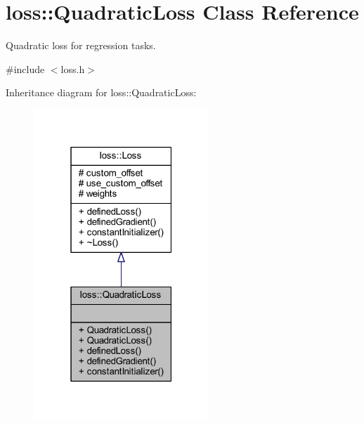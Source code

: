 \hypertarget{classloss_1_1_quadratic_loss}{}\section{loss\+:\+:Quadratic\+Loss Class Reference}
\label{classloss_1_1_quadratic_loss}


Quadratic loss for regression tasks.  




{\ttfamily \#include $<$loss.\+h$>$}



Inheritance diagram for loss\+:\+:Quadratic\+Loss\+:\nopagebreak
\begin{figure}[H]
\begin{center}
\leavevmode
\includegraphics[width=187pt]{classloss_1_1_quadratic_loss__inherit__graph}
\end{center}
\end{figure}


